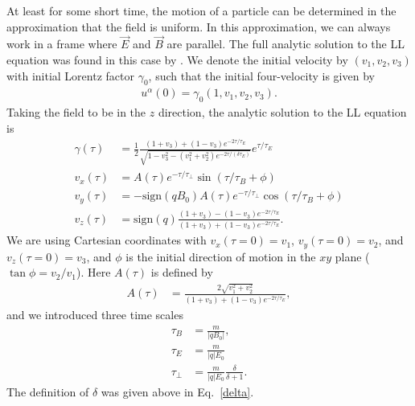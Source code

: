\documentclass[amsmath,amssymb,nofootinbib,notitlepage,superscriptaddress,twocolumn]{revtex4-2}
\begin{document}
At least for some short time, the motion of a particle can be determined in the approximation that the field is uniform.  In this approximation, we can always work in a frame where $\vec{E}$ and $\vec{B}$ are parallel.  The full analytic solution to the LL equation was found in this case by \cite{Heintzmann1973}.  We denote the initial velocity by $(v_1,v_2,v_3)$ with initial Lorentz factor $\gamma_0$, such that the initial four-velocity is given by 
\begin{align}
    u^{\alpha}(0)=\gamma_0 (1,v_1,v_2,v_3).
\end{align}
Taking the field to be in the $z$ direction, the analytic solution to the LL equation is
\begin{align}
    \gamma(\tau)&=\frac{1}{2}\frac{(1+v_3)+(1-v_3)e^{-2\tau/\tau_E}}{\sqrt{1-v_3^2-(v_1^2+v_2^2)e^{-2  \tau/(\delta\tau_E)}}}e^{\tau/\tau_E} \label{uniform_gamma}\\
    v_x(\tau)&=A(\tau)e^{-\tau/\tau_\perp}\sin(\tau/\tau_B+\phi) \label{uniform_vx} \\
    v_y(\tau)&=-\text{sign}(qB_0)A(\tau)e^{-\tau/\tau_\perp}\cos(\tau/\tau_B+\phi) \label{uniform_vy} \\
    v_z(\tau)&=\text{sign}(q)\frac{(1+v_3)-(1-v_3)e^{-2\tau/\tau_E}}{(1+v_3)+(1-v_3)e^{-2\tau/\tau_E}}.  \label{uniform_vz}
\end{align}
We are using Cartesian coordinates with $v_x(\tau=0)=v_1$, $v_y(\tau=0)=v_2$, and $v_z(\tau=0)=v_3$, and $\phi$ is the initial direction of motion in the $xy$ plane ($\tan \phi = v_2/v_1$).  Here $A(\tau)$ is defined by
\begin{align}
    A(\tau)&=\frac{2\sqrt{v_1^2+v_2^2} }{(1+v_3)+(1-v_3)e^{-2\tau/\tau_E}},
\end{align}
and we introduced three time scales
\begin{align}
\tau_{B} & = \frac{m}{|q B_0|}, \label{tauB} \\
\tau_{E} & = \frac{m}{|q| E_0} \label{tauE} \\
\tau_{\perp} & = \frac{m}{|q| E_0}\frac{\delta}{\delta+1}. \label{tauperp}
\end{align}
The definition of $\delta$ was given above in Eq.~\eqref{delta}.
\end{document}
